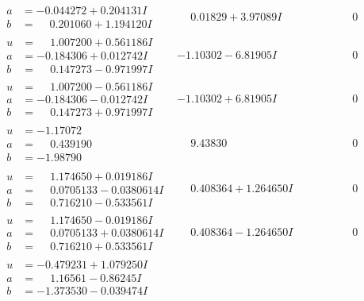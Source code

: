 \documentclass[1p]{elsarticle_modified}
\theoremstyle{definition}
\begin{document}
$$\begin{array}{c|c|c}
\begin{aligned}
a &= -0.044272 + 0.204131 I \\
b &= \phantom{-}0.201060 + 1.194120 I\end{aligned}
 & \phantom{-}0.01829 + 3.97089 I & \phantom{-0.000000 } 0 \\ \hline\begin{aligned}
u &= \phantom{-}1.007200 + 0.561186 I \\
a &= -0.184306 + 0.012742 I \\
b &= \phantom{-}0.147273 - 0.971997 I\end{aligned}
 & -1.10302 - 6.81905 I & \phantom{-0.000000 } 0 \\ \hline\begin{aligned}
u &= \phantom{-}1.007200 - 0.561186 I \\
a &= -0.184306 - 0.012742 I \\
b &= \phantom{-}0.147273 + 0.971997 I\end{aligned}
 & -1.10302 + 6.81905 I & \phantom{-0.000000 } 0 \\ \hline\begin{aligned}
u &= -1.17072\phantom{ +0.000000I} \\
a &= \phantom{-}0.439190\phantom{ +0.000000I} \\
b &= -1.98790\phantom{ +0.000000I}\end{aligned}
 & \phantom{-}9.43830\phantom{ +0.000000I} & \phantom{-0.000000 } 0 \\ \hline\begin{aligned}
u &= \phantom{-}1.174650 + 0.019186 I \\
a &= \phantom{-}0.0705133 - 0.0380614 I \\
b &= \phantom{-}0.716210 - 0.533561 I\end{aligned}
 & \phantom{-}0.408364 + 1.264650 I & \phantom{-0.000000 } 0 \\ \hline\begin{aligned}
u &= \phantom{-}1.174650 - 0.019186 I \\
a &= \phantom{-}0.0705133 + 0.0380614 I \\
b &= \phantom{-}0.716210 + 0.533561 I\end{aligned}
 & \phantom{-}0.408364 - 1.264650 I & \phantom{-0.000000 } 0 \\ \hline\begin{aligned}
u &= -0.479231 + 1.079250 I \\
a &= \phantom{-}1.16561 - 0.86245 I \\
b &= -1.373530 - 0.039474 I\end{aligned}

\end{array}$$
\end{document}
